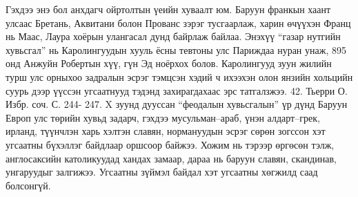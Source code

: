 Гэхдээ энэ бол анхдагч ойртолтын үеийн хуваалт юм. Баруун франкын хаант улсаас Бретань, Аквитани болон Прованс зэрэг тусгаарлаж, харин өчүүхэн Франц нь Маас, Лаура хоёрын улангасал дунд байрлаж байлаа. Энэхүү “газар нутгийн хувьсгал” нь Каролингуудын хууль ёсны тевтоны улс Париждаа нуран унаж, 895 онд Анжуйн Робертын хүү, гүн Эд ноёрхох болов. Каролингууд зуун жилийн турш улс орныхоо задралын эсрэг тэмцсэн хэдий ч ихээхэн олон янзийн хольцийн суурь дээр үүссэн угсаатнууд тэдэнд захирагдахаас эрс татгалзжээ. 42. Тьерри О. Избр. соч. С. 244- 247.
X зуунд дууссан “феодалын хувьсгалын” үр дүнд Баруун Европ улс төрийн хувьд задарч, гэхдээ мусульман–араб, үнэн алдарт–грек, ирланд, түүнчлэн харь хэлтэн славян, нормануудын эсрэг сөрөн зогссон хэт угсаатны бүхэллэг байдлаар оршсоор байжээ. Хожим нь тэрээр өргөсөн тэлж, англосаксийн католикуудад хандах замаар, дараа нь баруун славян, скандинав, унгаруудыг залгижээ. Угсаатны зүймэл байдал хэт угсаатны хөгжилд саад болсонгүй.

